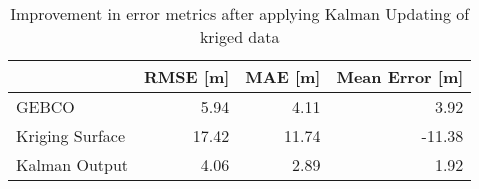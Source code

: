 \begin{table}
\centering
\caption{Improvement in error metrics after applying Kalman Updating of kriged data}
\label{tab:oahu2_gebco_raster_error}
\begin{tabular}{lrrr}
\toprule
 & RMSE [m] & MAE [m] & Mean Error [m] \\
\midrule
GEBCO & 5.94 & 4.11 & 3.92 \\
Kriging Surface & 17.42 & 11.74 & -11.38 \\
Kalman Output & 4.06 & 2.89 & 1.92 \\
\bottomrule
\end{tabular}
\end{table}
